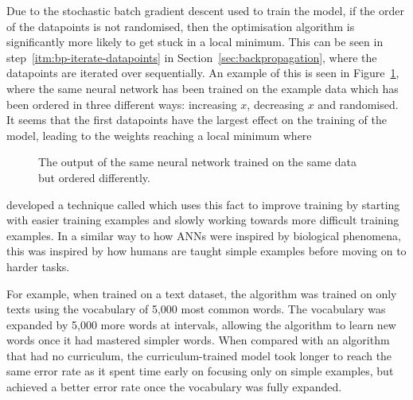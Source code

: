 Due to the stochastic batch gradient descent used to train the model, if the order of the datapoints is not randomised, then the optimisation algorithm is significantly more likely to get stuck in a local minimum.
This can be seen in step~\ref{itm:bp-iterate-datapoints} in Section~\ref{sec:backpropagation}, where the datapoints are iterated over sequentially.
An example of this is seen in Figure~\ref{fig:compare-order}, where the same neural network has been trained on the example data which has been ordered in three different ways: increasing \(x\), decreasing \(x\) and randomised.
It seems that the first datapoints have the largest effect on the training of the model, leading to the weights reaching a local minimum where 

\begin{figure}[htbp]
	\centering
	
	\caption{The output of the same neural network trained on the same data but ordered differently.}
	\label{fig:compare-order}
\end{figure}

\textcite{bengio2009} developed a technique called  which uses this fact to improve training by starting with easier training examples and slowly working towards more difficult training examples.
In a similar way to how \aclp{ANN} were inspired by biological phenomena, this was inspired by how humans are taught simple examples before moving on to harder tasks.

For example, when trained on a text dataset, the algorithm was trained on only texts using the vocabulary of 5,000 most common words.
The vocabulary was expanded by 5,000 more words at intervals, allowing the algorithm to learn new words once it had mastered simpler words.
When compared with an algorithm that had no curriculum, the curriculum-trained model took longer to reach the same error rate as it spent time early on focusing only on simple examples, but achieved a better error rate once the vocabulary was fully expanded.
